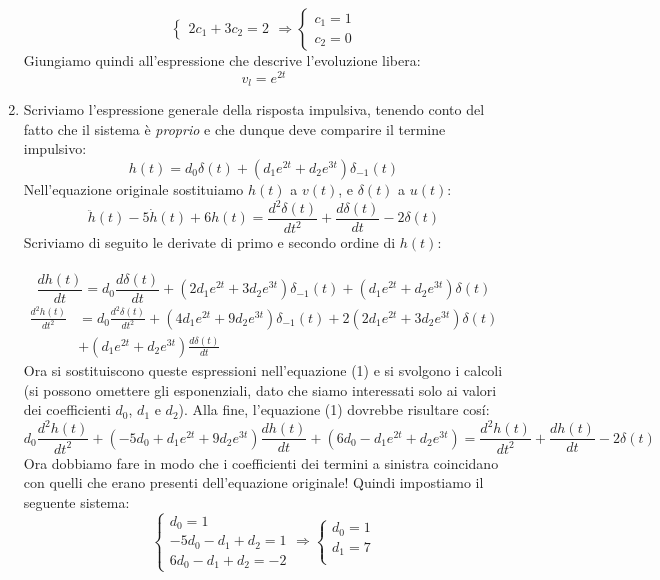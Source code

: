 \documentclass[12pt,a4paper]{article}
\begin{document}
\begin{enumerate}
\[\begin{cases}
				2c_1 + 3c_2 = 2
			\end{cases}
			\Rightarrow
			\begin{cases}
				c_1 = 1\\
				c_2 = 0
			\end{cases}
		\]
		Giungiamo quindi all'espressione che descrive l'evoluzione libera:
		\[
			v_l = e^{2t}
		\]
		\item Scriviamo l'espressione generale della risposta impulsiva, tenendo conto del fatto che il sistema è \textit{proprio} e che dunque deve comparire il termine impulsivo:
		\[
			h(t) = d_0\delta(t)+(d_1e^{2t} + d_2e^{3t})\delta_{-1}(t)
		\]
		Nell'equazione originale sostituiamo $h(t)$ a $v(t)$, e $\delta(t)$ a $u(t)$:
		\begin{equation}
			\ddot{h}(t) - 5\dot{h}(t) + 6h(t) = \frac{d^2\delta(t)}{dt^2} + \frac{d\delta(t)}{dt} -2\delta(t)
		\end{equation}
		Scriviamo di seguito le derivate di primo e secondo ordine di $h(t)$:\\ \\
		\[
			\frac{d h(t)}{dt} = d_0\frac{d \delta(t)}{dt} + (2d_1e^{2t} + 3d_2e^{3t})\delta_{-1}(t) + (d_1e^{2t} + d_2e^{3t})\delta(t)
		\]
		\begin{align*}
			\frac{d^2h(t)}{dt^2} &= d_0\frac{d^2\delta(t)}{dt^2} + (4d_1e^{2t} + 9d_2e^{3t})\delta_{-1}(t) + 2(2d_1e^{2t}+ 3d_2e^{3t})\delta(t) \\& + (d_1e^{2t} + d_2e^{3t})\frac{d\delta(t)}{dt}
		\end{align*}
		Ora si sostituiscono queste espressioni nell'equazione (1) e si svolgono i calcoli (si possono omettere gli esponenziali, dato che siamo interessati solo ai valori dei coefficienti $d_0$, $d_1$ e $d_2$).
		Alla fine, l'equazione (1) dovrebbe risultare cos\'i:
		\[
			d_0\frac{d^2h(t)}{dt^2} + (-5d_0 + d_1e^{2t} + 9d_2e^{3t})\frac{d h(t)}{dt} + (6d_0 - d_1e^{2t} + d_2e^{3t}) = \frac{d^2h(t)}{dt^2} + \frac{d h(t)}{dt} - 2\delta(t)
		\]
		Ora dobbiamo fare in modo che i coefficienti dei termini a sinistra coincidano con quelli che erano presenti dell'equazione originale! Quindi impostiamo il seguente sistema:
		\[
			\begin{cases}
				d_0 = 1\\
				-5d_0 -d_1 + d_2 = 1\\
				6d_0 - d_1 + d_2 = -2
			\end{cases}
			\Rightarrow
			\begin{cases}
				d_0 = 1\\
				d_1 = 7\\

\end{cases}\]
\end{enumerate}
\end{document}
